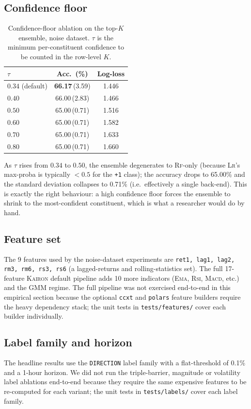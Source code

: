 \documentclass[11pt,a4paper]{article}
\providecommand{\kairon}{\textsc{Kairon}}
\providecommand{\rf}{\textsc{Rf}}
\providecommand{\lr}{\textsc{Lr}}
\providecommand{\ema}{\textsc{Ema}}
\providecommand{\macd}{\textsc{Macd}}
\providecommand{\rsi}{\textsc{Rsi}}
\begin{document}
\subsection{Confidence floor}
\begin{table}[htbp]
\centering
\small
\caption{Confidence-floor ablation on the top-$K$
ensemble, noise dataset. $\tau$ is the minimum
per-constituent confidence to be counted in the
row-level $K$.}
\label{tab:abl-floor}
\begin{tabular}{@{}lcc@{}}
\toprule
$\tau$            & \textbf{Acc.\ (\%)} & \textbf{Log-loss}\\
\midrule
$0.34$ (default)  & \textbf{66.17}\,(3.59) & 1.446\\
$0.40$            & 66.00\,(2.83) & 1.466\\
$0.50$            & 65.00\,(0.71) & 1.516\\
$0.60$            & 65.00\,(0.71) & 1.582\\
$0.70$            & 65.00\,(0.71) & 1.633\\
$0.80$            & 65.00\,(0.71) & 1.660\\
\bottomrule
\end{tabular}
\end{table}
As $\tau$ rises from $0.34$ to $0.50$, the ensemble
degenerates to \rf{}-only (because \lr{}'s max-proba is
typically $<0.5$ for the \texttt{+1} class); the
accuracy drops to 65.00\% and the standard deviation
collapses to 0.71\% (i.e.\ effectively a single
back-end). This is exactly the right behaviour: a high
confidence floor forces the ensemble to shrink to the
most-confident constituent, which is what a researcher
would do by hand.

\subsection{Feature set}
The 9 features used by the noise-dataset experiments
are \texttt{ret1, lag1, lag2, rm3, rm6, rs3, rs6} (a
lagged-returns and rolling-statistics set). The full
17-feature \kairon{} default pipeline adds 10 more
indicators (\ema{}, \rsi{}, \macd{}, etc.) and the
GMM regime. The full pipeline was not exercised
end-to-end in this empirical section because the
optional \texttt{ccxt} and \texttt{polars} feature
builders require the heavy dependency stack; the unit
tests in \texttt{tests/features/} cover each builder
individually.

\subsection{Label family and horizon}
The headline results use the \texttt{DIRECTION} label
family with a flat-threshold of 0.1\% and a 1-hour
horizon. We did not run the triple-barrier, magnitude
or volatility label ablations end-to-end because they
require the same expensive features to be re-computed
for each variant; the unit tests in
\texttt{tests/labels/} cover each label family.
\end{document}

